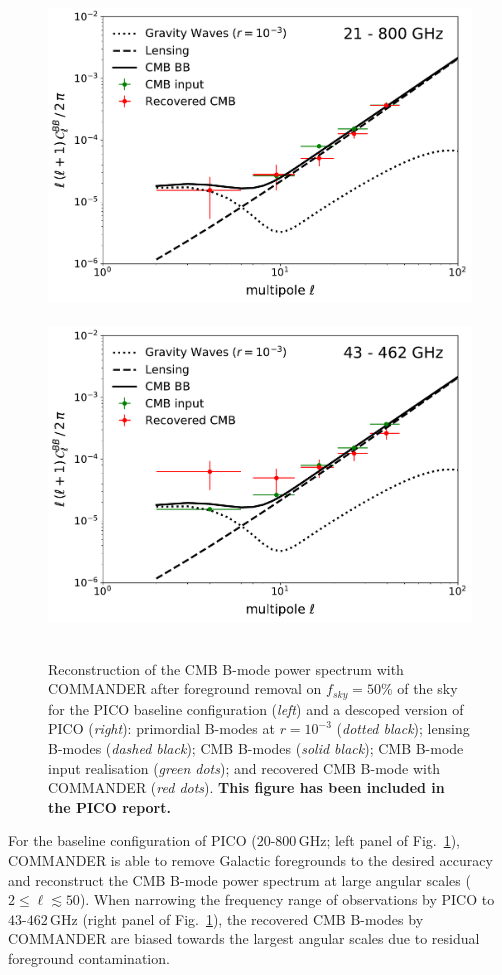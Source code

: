 \documentclass[12pt]{article}
\begin{document}
\begin{figure}
  \begin{center}
    \includegraphics[width=0.5\columnwidth]{figures_memo/commander_pico_baseline.pdf}~
     \includegraphics[width=0.5\columnwidth]{figures_memo/commander_pico_descoped.pdf}~
  \end{center}
\caption{Reconstruction of the CMB B-mode power spectrum with COMMANDER after foreground removal on $f_{sky}=50\%$ of the sky for the PICO baseline configuration (\emph{left}) and a descoped version of PICO (\emph{right}): primordial B-modes at $r=10^{-3}$ (\emph{dotted black}); lensing B-modes (\emph{dashed black}); CMB B-modes (\emph{solid black}); CMB B-mode input realisation (\emph{green dots}); and recovered CMB B-mode with COMMANDER (\emph{red dots}). {\bf This figure has been included in the PICO report.}}
\label{Fig:commander_pico_90p91}
\end{figure}

For the baseline configuration of PICO ({$20$-$800$\,GHz}; left panel of Fig.~\ref{Fig:commander_pico_90p91}), COMMANDER is able to remove Galactic foregrounds to the desired accuracy and reconstruct the CMB B-mode power spectrum at large angular scales ($2\leq \ell \lesssim 50$). When narrowing the frequency range of observations by PICO to {$43$-$462$\,GHz} (right panel of Fig.~\ref{Fig:commander_pico_90p91}), the recovered CMB B-modes by COMMANDER are biased towards the largest angular scales due to residual foreground contamination.
\end{document}
